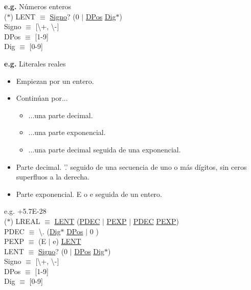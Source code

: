 \documentclass[\main/ApuntesPL.tex]{subfiles}
\begin{document}
      \bigskip
      \par
      \textbf{e.g.} Números enteros\\
      \hspace{5mm}($\ast$) LENT $\equiv$ \underline{Signo}? (0 $\mid$ \underline{DPos} \underline{Dig}$\ast$) \\
      \hspace{10mm} Signo $\equiv$ [\textbackslash+, \textbackslash-] \\
      \hspace{10mm} DPos  $\equiv$ [1-9] \\
      \hspace{10mm} Dig   $\equiv$ [0-9]

      \bigskip
      \par
      \textbf{e.g.} Literales reales
      \begin{itemize}
        \item Empiezan por un entero.
        \item Continúan por...
          \begin{itemize}
            \item ...una parte decimal.
            \item ...una parte exponencial.
            \item ...una parte decimal seguida de una exponencial.
          \end{itemize}
        \item Parte decimal. '.' seguido de una secuencia de uno o más dígitos, sin ceros superfluos a la derecha.
        \item Parte exponencial. E o e seguida de un entero.
      \end{itemize}
      \hspace{10mm}e.g. +5.7E-28\\
      \bigskip
      \hspace{5mm}($\ast$) LREAL $\equiv$ \underline{LENT} (\underline{PDEC} $\mid$ \underline{PEXP} $\mid$ \underline{PDEC} \underline{PEXP}) \\
      \hspace{10mm} PDEC $\equiv$ \textbackslash. (\underline{Dig}$\ast$ \underline{DPos} $\mid$ 0 ) \\
      \hspace{10mm} PEXP $\equiv$ (E $\mid$ e) \underline{LENT} \\
      \vspace{2mm}
      \hspace{10mm} LENT $\equiv$ \underline{Signo}? (0 $\mid$ \underline{DPos} \underline{Dig}$\ast$) \\
      \hspace{10mm} Signo $\equiv$ [\textbackslash+, \textbackslash-] \\
      \hspace{10mm} DPos  $\equiv$ [1-9] \\
      \hspace{10mm} Dig   $\equiv$ [0-9]
\end{document}
